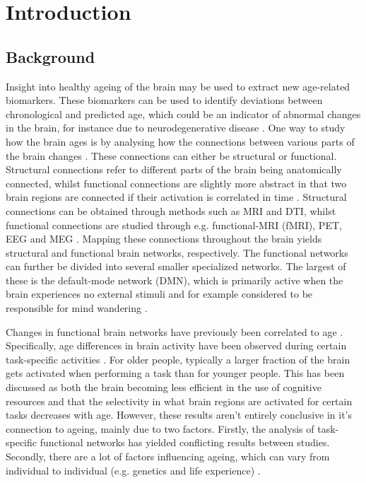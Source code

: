 \chapter{Introduction}

\section{Background}
Insight into healthy ageing of the brain may be used to extract new age-related biomarkers. These biomarkers can be used to identify deviations between chronological and predicted age, which could be an indicator of abnormal changes in the brain, for instance due to neurodegenerative disease \cite{multiplex}. One way to study how the brain ages is by analysing how the connections between various parts of the brain changes \cite{grady}. These connections can either be structural or functional. Structural connections refer to different parts of the brain being anatomically connected, whilst functional connections are slightly more abstract in that two brain regions are connected if their activation is correlated in time \cite{sporns}. Structural connections can be obtained through methods such as MRI and DTI, whilst functional connections are studied through e.g. functional-MRI (fMRI), PET, EEG and MEG \cite{hirsch}. Mapping these connections throughout the brain yields structural and functional brain networks, respectively. The functional networks can further be divided into several smaller specialized networks. The largest of these is the default-mode network (DMN), which is primarily active when the brain experiences no external stimuli and for example considered to be responsible for mind wandering \cite{alves_dmn}.

Changes in functional brain networks have previously been correlated to age \cite{grady}. Specifically, age differences in brain activity have been observed during certain task-specific activities \cite{grady}. For older people, typically a larger fraction of the brain gets activated when performing a task than for younger people. This has been discussed as both the brain becoming less efficient in the use of cognitive resources and that the selectivity in what brain regions are activated for certain tasks decreases with age. However, these results aren't entirely conclusive in it's connection to ageing, mainly due to two factors. Firstly, the analysis of task-specific functional networks has yielded conflicting results between studies. Secondly, there are a lot of factors influencing ageing, which can vary from individual to individual (e.g. genetics and life experience) \cite{grady}. 

